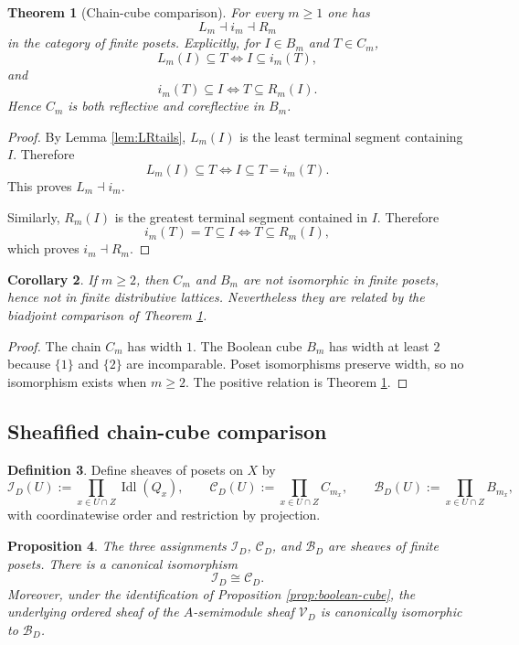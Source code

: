 \documentclass[11pt,a4paper]{article}
\newtheorem{theorem}{Theorem}[section]
\newtheorem{proposition}[theorem]{Proposition}
\newtheorem{corollary}[theorem]{Corollary}
\theoremstyle{definition}
\newtheorem{definition}[theorem]{Definition}
\theoremstyle{remark}
\DeclareMathOperator{\Idl}{Idl}
\newcommand{\cV}{\mathcal V}
\newcommand{\cI}{\mathcal I}
\newcommand{\cB}{\mathcal B}
\newcommand{\cC}{\mathcal C}
\begin{document}
\begin{theorem}[Chain-cube comparison]\label{thm:chain-cube}
For every $m\ge1$ one has
\[
L_m\dashv i_m\dashv R_m
\]
in the category of finite posets.  Explicitly, for $I\in B_m$ and $T\in C_m$,
\[
L_m(I)\subseteq T \iff I\subseteq i_m(T),
\]
and
\[
i_m(T)\subseteq I \iff T\subseteq R_m(I).
\]
Hence $C_m$ is both reflective and coreflective in $B_m$.
\end{theorem}

\begin{proof}
By Lemma \ref{lem:LRtails}, $L_m(I)$ is the least terminal segment containing $I$.  Therefore
\[
L_m(I)\subseteq T\iff I\subseteq T=i_m(T).
\]
This proves $L_m\dashv i_m$.

Similarly, $R_m(I)$ is the greatest terminal segment contained in $I$.  Therefore
\[
i_m(T)=T\subseteq I\iff T\subseteq R_m(I),
\]
which proves $i_m\dashv R_m$.
\end{proof}

\begin{corollary}\label{cor:not-iso-chain-cube}
If $m\ge2$, then $C_m$ and $B_m$ are not isomorphic in finite posets, hence not in finite distributive lattices.  Nevertheless they are related by the biadjoint comparison of Theorem \ref{thm:chain-cube}.
\end{corollary}

\begin{proof}
The chain $C_m$ has width $1$.  The Boolean cube $B_m$ has width at least $2$ because $\{1\}$ and $\{2\}$ are incomparable.  Poset isomorphisms preserve width, so no isomorphism exists when $m\ge2$.  The positive relation is Theorem \ref{thm:chain-cube}.
\end{proof}

\subsection{Sheafified chain-cube comparison}

\begin{definition}
Define sheaves of posets on $X$ by
\[
\cI_D(U):=\prod_{x\in U\cap Z}\Idl(Q_x),
\qquad
\cC_D(U):=\prod_{x\in U\cap Z}C_{m_x},
\qquad
\cB_D(U):=\prod_{x\in U\cap Z}B_{m_x},
\]
with coordinatewise order and restriction by projection.
\end{definition}

\begin{proposition}\label{prop:sheaves-posets}
The three assignments $\cI_D$, $\cC_D$, and $\cB_D$ are sheaves of finite posets.  There is a canonical isomorphism
\[
\cI_D\cong \cC_D.
\]
Moreover, under the identification of Proposition \ref{prop:boolean-cube}, the underlying ordered sheaf of the $A$-semimodule sheaf $\cV_D$ is canonically isomorphic to $\cB_D$.
\end{proposition}
\end{document}
